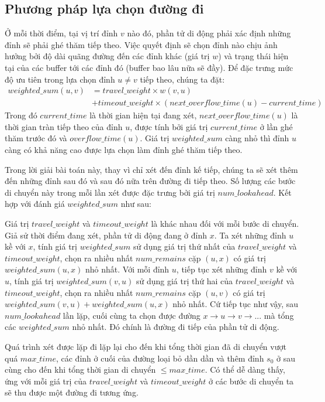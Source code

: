 \documentclass[12pt]{report}
\begin{document}
\subsection{Phương pháp lựa chọn đường đi}
Ở mỗi thời điểm, tại vị trí đỉnh $v$ nào đó, phần tử di động phải xác định những đỉnh sẽ phải ghé thăm tiếp theo. Việc quyết định sẽ chọn đỉnh nào chịu ảnh hưởng bởi độ dài quãng đường đến các đỉnh khác (giá trị $w$) và trạng thái hiện tại của các buffer tới các đỉnh đó (buffer bao lâu nữa sẽ đầy). Để đặc trưng mức độ ưu tiên trong lựa chọn đỉnh $u \neq v$ tiếp theo, chúng ta đặt: 
\begin{equation*}
\begin{split}
weighted\_sum(u, v) & = travel\_weight \times  w(v, u) \\
	& + timeout\_weight \times (next\_overflow\_time(u) - current\_time)
\end{split}
\end{equation*}
Trong đó $current\_time$ là thời gian hiện tại đang xét, $next\_overflow\_time(u)$ là thời gian tràn tiếp theo của đỉnh $u$, được tính bởi giá trị $current\_time$ ở lần ghé thăm trước đó và $overflow\_time(u)$. Giá trị $weighted\_sum$ càng nhỏ thì đỉnh $u$ càng có khả năng cao được lựa chọn làm đỉnh ghé thăm tiếp theo. 

Trong lời giải bài toán này, thay vì chỉ xét đến đỉnh kế tiếp, chúng ta sẽ xét thêm đến những đỉnh sau đó và sau đó nữa trên đường đi tiếp theo. Số lượng các bước di chuyển này trong mỗi lần xét được đặc trưng bởi giá trị $num\_lookahead$. Kết hợp với đánh giá $weighted\_sum$ như sau: 

Giá trị $travel\_weight$ và $timeout\_weight$ là khác nhau đối với mỗi bước di chuyển. Giả sử thời điểm đang xét, phần tử di động đang ở đỉnh $x$. Ta xét những đỉnh $u$ kề với $x$, tính giá trị  $weighted\_sum$ sử dụng giá trị thứ nhất của  $travel\_weight$ và $timeout\_weight$, chọn ra nhiều nhất $num\_remains$ cặp $(u, x)$ có giá trị $weighted\_sum(u, x)$ nhỏ nhất. Với mỗi đỉnh $u$, tiếp tục xét những đỉnh $v$ kề với $u$, tính giá trị  $weighted\_sum(v, u)$ sử dụng giá trị thứ hai của  $travel\_weight$ và $timeout\_weight$, chọn ra nhiều nhất $num\_remains$ cặp $(u, v)$ có giá trị $weighted\_sum(v, u) + weighted\_sum(u, x)$ nhỏ nhất. Cứ tiếp tục như vậy, sau $num\_lookahead$ lần lặp, cuối cùng ta chọn được đường $x \rightarrow u \rightarrow v \rightarrow ...$ mà tổng các $weighted\_sum$ nhỏ nhất. Đó chính là đường đi tiếp của phần tử di động. 

Quá trình xét được lặp đi lặp lại cho đến khi tổng thời gian đã di chuyển vượt quá $max\_time$, các đỉnh ở cuối của đường loại bỏ dần dần và thêm đỉnh $s_0$ ở sau cùng cho đến khi tổng thời gian di chuyển $ \leq max\_time$. Có thể dễ dàng thấy, ứng với mỗi giá trị của $travel\_weight$ và $timeout\_weight$ ở các bước di chuyển ta sẽ thu được một đường đi tương ứng. 
\end{document}
